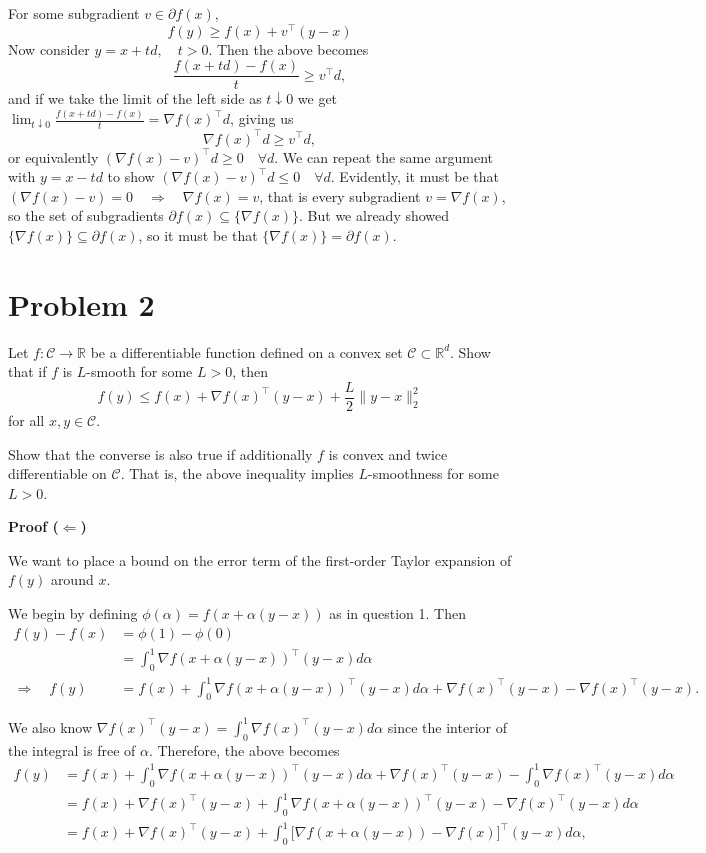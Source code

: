 \documentclass[11pt]{article}
\begin{document}
For some subgradient $v \in \partial f(x)$, 
\[
f(y) \ge f(x) + v^\top (y - x)
\]
Now consider $y = x + td, \quad t > 0$. Then the above becomes
\[
\frac{f(x + td) - f(x)}{t} \geq v^\top d,
\]
and if we take the limit of the left side as $t \downarrow0$ we get $\lim_{t \downarrow 0} \frac{f(x + td) - f(x)}{t} = \nabla f(x)^\top d$, giving us
\[
\nabla f(x)^\top d \geq v^\top d,
\]
or equivalently $(\nabla f(x) - v)^\top d \geq 0 \quad \forall d$. We can repeat the same argument with $y = x - td$ to show $(\nabla f(x) - v)^\top d \leq 0 \quad \forall d$. Evidently, it must be that $(\nabla f(x) - v) = 0 \quad \Rightarrow \quad \nabla f(x) = v$, that is every subgradient $v = \nabla f(x)$, so the set of subgradients $\partial f(x) \subseteq \{\nabla f(x)\}$. But we already showed $\{\nabla f(x)\} \subseteq \partial f(x)$, so it must be that $\{\nabla f(x)\} = \partial f(x)$.

\hrulefill

\section*{Problem 2}
Let $f : \mathcal{C} \to \mathbb{R}$ be a differentiable function defined on a convex set
$\mathcal{C} \subset \mathbb{R}^d$. Show that if $f$ is $L$-smooth for some $L > 0$, then
\[
f(y) \le f(x) + \nabla f(x)^\top (y - x) + \frac{L}{2}\|y - x\|_2^2
\]
for all $x, y \in \mathcal{C}$.

Show that the converse is also true if additionally $f$ is convex and twice differentiable on
$\mathcal{C}$. That is, the above inequality implies $L$-smoothness for some $L > 0$.

\hrulefill

\textbf{Proof ($\Leftarrow$)}

We want to place a bound on the error term of the first-order Taylor expansion of $f(y)$ around $x$.

We begin by defining $\phi(\alpha) = f(x + \alpha(y-x))$ as in question 1. Then
\begin{align*}
    f(y) - f(x) &= \phi(1) - \phi(0) \\
    &= \int_0^1 \nabla f(x + \alpha (y-x))^\top (y-x) d\alpha \\
    \Rightarrow \quad f(y) &= f(x) + \int_0^1 \nabla f(x + \alpha (y-x))^\top (y-x) d\alpha + \nabla f(x)^\top (y-x) - \nabla f(x)^\top (y-x).
\end{align*}

We also know $\nabla f(x)^\top (y-x) = \int_0^1 \nabla f(x)^\top (y-x)d\alpha$ since the interior of the integral is free of $\alpha$. Therefore, the above becomes
\begin{align}
    f(y) &= f(x) + \int_0^1 \nabla f(x + \alpha (y-x))^\top (y-x) d\alpha + \nabla f(x)^\top (y-x) - \int_0^1 \nabla f(x)^\top (y-x)d\alpha \nonumber \\ 
    &= f(x) + \nabla f(x)^\top (y-x) + \int_0^1 \nabla f(x + \alpha (y-x))^\top (y-x) - \nabla f(x)^\top (y-x)d\alpha \nonumber \\
    &= f(x) + \nabla f(x)^\top (y-x) + \int_0^1 \big[\nabla f(x + \alpha (y-x)) - \nabla f(x)\big]^\top (y-x) d\alpha \label{2.1},
\end{align}
\end{document}
